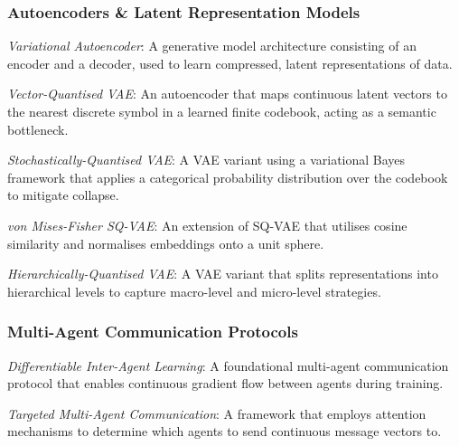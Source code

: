{\subsubsection*{Autoencoders \& Latent Representation Models}
\begin{description}[labelwidth=2.5cm, leftmargin=2.6cm, style=multiline, noitemsep, topsep=0pt]
    \item[VAE] \textit{Variational Autoencoder}: A generative model architecture consisting of an encoder and a decoder, used to learn compressed, latent representations of data.
    \item[VQ-VAE] \textit{Vector-Quantised VAE}: An autoencoder that maps continuous latent vectors to the nearest discrete symbol in a learned finite codebook, acting as a semantic bottleneck. \cite{VQVAE}
    \item[SQ-VAE] \textit{Stochastically-Quantised VAE}: A VAE variant using a variational Bayes framework that applies a categorical probability distribution over the codebook to mitigate collapse. \cite{SQVAE}
    \item[vMF SQ-VAE] \textit{von Mises-Fisher SQ-VAE}: An extension of SQ-VAE that utilises cosine similarity and normalises embeddings onto a unit sphere. \cite{SQVAE, semantic-direction}
    \item[HQ-VAE] \textit{Hierarchically-Quantised VAE}: A VAE variant that splits representations into hierarchical levels to capture macro-level and micro-level strategies. \cite{HQVAE}
\end{description}

\vspace{-5pt}
\subsubsection*{Multi-Agent Communication Protocols}
\begin{description}[labelwidth=2.5cm, leftmargin=2.7cm, style=multiline, noitemsep, topsep=0pt]
    \item[DIAL] \textit{Differentiable Inter-Agent Learning}: A foundational multi-agent communication protocol that enables continuous gradient flow between agents during training. \cite{dial-rial}
    \item[TarMAC] \textit{Targeted Multi-Agent Communication}: A framework that employs attention mechanisms to determine which agents to send continuous message vectors to. \cite{tarmac}
\end{description}

}
